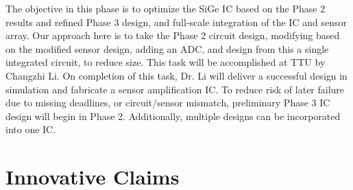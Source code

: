 The objective in this phase is to optimize the SiGe IC based on the Phase 2 results and refined Phase 3 design, and full-scale integration of the IC and sensor array. Our approach here is to take the Phase 2 circuit design, modifying based on the modified sensor design, adding an ADC,  and design from this a single integrated circuit, to reduce size. This task will be accomplished at TTU by Changzhi Li. On completion of this task, Dr. Li will deliver a successful design in simulation and fabricate a sensor amplification IC. To reduce risk of later failure due to missing deadlines, or circuit/sensor mismatch, preliminary Phase 3 IC design will begin in Phase 2. Additionally, multiple designs can be incorporated into one IC.

\section{Innovative Claims}\label{sec:inno}

